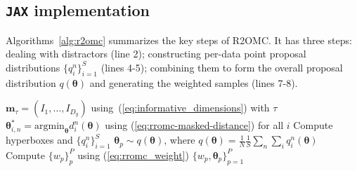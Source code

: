 \documentclass[twoside]{article}
\newcommand{\thb}{\boldsymbol{\theta}}
\newcommand{\ub}{\mathbf{u}}
\newcommand{\yb}{\mathbf{y}}
\newcommand{\data}{\mathbf{y}^o}
\newcommand{\rromc}{R2OMC}
\newcommand{\mask}{\mathbf{m}_\tau}
\begin{document}


\subsection{\texttt{JAX} implementation}
\label{subsec:implementation}

Algorithms~\ref{alg:r2omc} summarizes the key steps of \rromc. It has three steps: dealing with distractors (line 2); constructing per-data point proposal distributions $\{q_i^n\}_{i=1}^S$ (lines 4-5); combining them to form the overall proposal distribution $q(\thb)$ and generating the weighted samples (lines 7-8).

\begin{algorithm}[!ht]
  \caption{\texttt{R2OMC}. Requires: $p(\thb), g(\thb, \ub), \{\data_n\}_{n=1}^{N}$}
  \label{alg:r2omc}
  \begin{algorithmic}[1]
    \Procedure{\rromc}{$\tau, S, P$}
      \State $\mask = (I_1, \ldots, I_{D_{y}})$ using~(\ref{eq:informative_dimensions}) with $\tau$ 
      \State $\thb_{i,n}^* = \text{argmin}_{\thb} d_i^n(\thb)$ using (\ref{eq:rromc-masked-distance}) for all $i$
      \State Compute hyperboxes and $\{q_i^n\}_{i=1}^S$
    \EndFor
    \State $\thb_p \sim q(\thb)$, where $ q(\thb)= \frac{1}{N} \frac{1}{S} \sum_n \sum_i q_i^n (\thb)$
    \State Compute $\{w_p\}_p^P $ using (\ref{eq:rromc_weight})
    \State \Return $\{w_p, \thb_p\}_{p=1}^{P}$ 
    \EndProcedure
  \end{algorithmic}
\end{algorithm}
\end{document}

